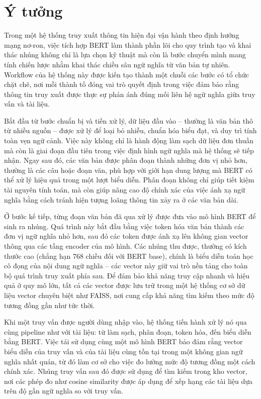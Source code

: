 \section{Ý tưởng}
Trong một hệ thống truy xuất thông tin hiện đại vận hành theo định hướng mạng nơ-ron, việc tích hợp BERT làm thành phần lõi cho quy trình tạo và khai thác nhúng không chỉ là lựa chọn kỹ thuật mà còn là bước chuyển mình mang tính chiến lược nhằm khai thác chiều sâu ngữ nghĩa từ văn bản tự nhiên. Workflow của hệ thống này được kiến tạo thành một chuỗi các bước có tổ chức chặt chẽ, nơi mỗi thành tố đóng vai trò quyết định trong việc đảm bảo rằng thông tin truy xuất được thực sự phản ánh đúng mối liên hệ ngữ nghĩa giữa truy vấn và tài liệu.

Bắt đầu từ bước chuẩn bị và tiền xử lý, dữ liệu đầu vào -- thường là văn bản thô từ nhiều nguồn -- được xử lý để loại bỏ nhiễu, chuẩn hóa biểu đạt, và duy trì tính toàn vẹn ngữ cảnh. Việc này không chỉ là hành động làm sạch dữ liệu đơn thuần mà còn là giai đoạn đầu tiên trong việc định hình ngữ nghĩa mà hệ thống sẽ tiếp nhận. Ngay sau đó, các văn bản được phân đoạn thành những đơn vị nhỏ hơn, thường là các câu hoặc đoạn văn, phù hợp với giới hạn dung lượng mà BERT có thể xử lý hiệu quả trong một lượt biểu diễn. Phân đoạn không chỉ giúp tiết kiệm tài nguyên tính toán, mà còn giúp nâng cao độ chính xác của việc ánh xạ ngữ nghĩa bằng cách tránh hiện tượng loãng thông tin xảy ra ở các văn bản dài.

Ở bước kế tiếp, từng đoạn văn bản đã qua xử lý được đưa vào mô hình BERT để sinh ra nhúng. Quá trình này bắt đầu bằng việc token hóa văn bản thành các đơn vị ngữ nghĩa nhỏ hơn, sau đó các token được ánh xạ lên không gian vector thông qua các tầng encoder của mô hình. Các nhúng thu được, thường có kích thước cao (chẳng hạn 768 chiều đối với BERT base), chính là biểu diễn toán học cô đọng của nội dung ngữ nghĩa -- các vector này giữ vai trò nền tảng cho toàn bộ quá trình truy xuất phía sau. Để đảm bảo khả năng truy cập nhanh và hiệu quả ở quy mô lớn, tất cả các vector được lưu trữ trong một hệ thống cơ sở dữ liệu vector chuyên biệt như FAISS, nơi cung cấp khả năng tìm kiếm theo mức độ tương đồng gần như tức thời.

Khi một truy vấn được người dùng nhập vào, hệ thống tiến hành xử lý nó qua cùng pipeline như với tài liệu: từ làm sạch, phân đoạn, token hóa, đến biểu diễn bằng BERT. Việc tái sử dụng cùng một mô hình BERT bảo đảm rằng vector biểu diễn của truy vấn và của tài liệu cùng tồn tại trong một không gian ngữ nghĩa nhất quán, từ đó làm cơ sở cho việc đo lường mức độ tương đồng một cách chính xác. Nhúng truy vấn sau đó được sử dụng để tìm kiếm trong kho vector, nơi các phép đo như cosine similarity được áp dụng để xếp hạng các tài liệu dựa trên độ gần ngữ nghĩa so với truy vấn.

